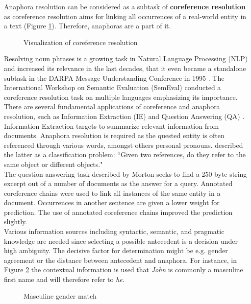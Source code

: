 Anaphora resolution can be considered as a subtask of \textbf{coreference resolution} as coreference resolution aims for linking all occurrences of a real-world entity in a text (Figure \ref{figure:visofcoref}). Therefore, anaphoras are a part of it. 

\begin{figure}[h]
	\centering\sffamily
		\caption{Visualization of coreference resolution}
	\label{figure:visofcoref}
\end{figure}

Resolving noun phrases is a growing task in Natural Language Processing (NLP) and increased its relevance in the last decades, that it even became a standalone subtask in the DARPA Message Understanding Conference in 1995 \citep{chinchor1995message}. The International Workshop on Semantic Evaluation (SemEval) conducted a coreference resolution task on multiple languages \citep{recasens2010semeval} emphasizing its importance. 
There are several fundamental applications of coreference and anaphora resolution, such as Information Extraction (IE) \citep{mccarthy1995using} and Question Answering (QA) \citep{morton2000coreference}.\\ 
Information Extraction targets to summarize relevant information from documents. Anaphora resolution is required as the quested entity is often referenced through various words, amongst others personal pronouns. \citep{mccarthy1995using} described the latter as a classification problem: “Given two references, do they refer to the same object or different objects."\\
The question answering task described by Morton seeks to find a 250 byte string excerpt out of a number of documents as the answer for a query. Annotated coreference chains were used to link all instances of the same entity in a document. Occurrences in another sentence are given a lower weight for prediction. The use of annotated coreference chains improved the prediction slightly.\\
Various information sources including syntactic, semantic, and pragmatic knowledge are needed since selecting a possible antecedent is a decision under high ambiguity. The decisive factor for determination might be e.g. gender agreement or the distance between antecedent and anaphora. For instance, in Figure \ref{figure:mascmatch} the contextual information is used that \textit{John} is commonly a masculine first name and will therefore refer to \textit{he}.
\begin{figure}[h]
\centering\sffamily
\caption{Masculine gender match}
	\label{figure:mascmatch}
\end{figure}

